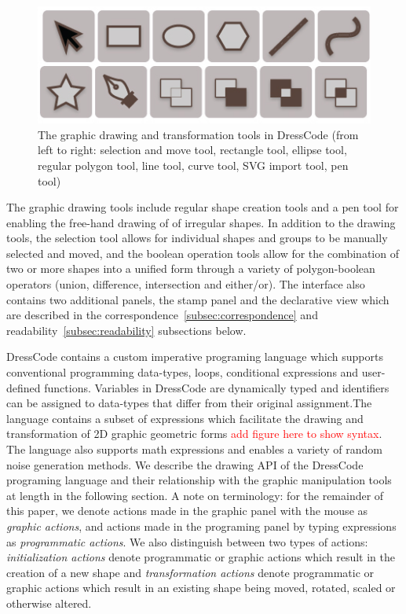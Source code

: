 \documentclass{sigchi}
\begin{document}
\begin{center}
\begin{figure}[h!]
\includegraphics[width=\columnwidth]{images/graphic_tools.jpg}
\caption{The graphic drawing and transformation tools in DressCode (from left to right: selection and move tool, rectangle tool, ellipse tool, regular polygon tool, line tool, curve tool, SVG import tool, pen tool)}
\label{fig:graphic_tools}
\end{figure}
\end{center}
\vspace{-20pt}

The graphic drawing tools include regular shape creation tools and a pen tool for enabling the free-hand drawing of of irregular shapes. In addition to the drawing tools, the selection tool allows for individual shapes and groups to be manually selected and moved, and the boolean operation tools allow for the combination of two or more shapes into a unified form through a variety of polygon-boolean operators (union, difference, intersection and either/or). The interface also contains two additional panels, the stamp panel and the declarative view which are described in the correspondence~\ref{subsec:correspondence} and readability~\ref{subsec:readability} subsections below.

 DressCode contains a custom imperative programing language which supports conventional programming data-types, loops, conditional expressions and user-defined functions. Variables in DressCode are dynamically typed and identifiers can be assigned to data-types that differ from their original assignment.The language contains a subset of expressions which facilitate the drawing and transformation of 2D graphic geometric forms \textcolor{red}{add figure here to show syntax}. The language also supports math expressions and enables a variety of random noise generation methods. We describe the drawing API of the DressCode programing language and their relationship with the graphic manipulation tools at length in the following section. A note on terminology: for the remainder of this paper, we denote actions made in the graphic panel with the mouse as \textit{graphic actions}, and actions made in the programing panel by typing expressions as \textit{programmatic actions}. We also distinguish between two types of actions: \textit{initialization actions} denote programmatic or graphic actions which result in the creation of a new shape and \textit{transformation actions} denote programmatic or graphic actions which result in an existing shape being moved, rotated, scaled or otherwise altered.  
\end{document}
